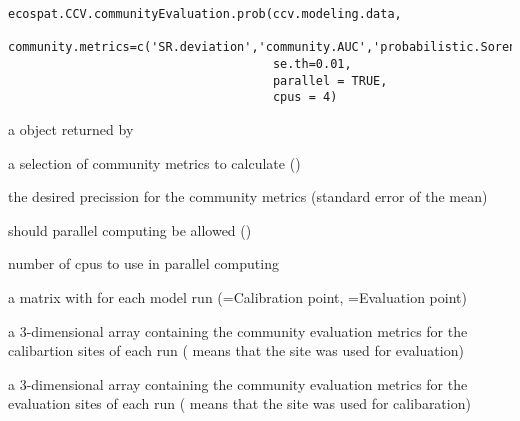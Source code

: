 \documentclass[a4paper]{book}
\begin{document}
%
\begin{Usage}
\begin{verbatim}
ecospat.CCV.communityEvaluation.prob(ccv.modeling.data, 
                                     community.metrics=c('SR.deviation','community.AUC','probabilistic.Sorensen'), 
                                     se.th=0.01, 
                                     parallel = TRUE, 
                                     cpus = 4)
\end{verbatim}
\end{Usage}
%
\begin{Arguments}
\begin{ldescription}
\item[\code{cvv.modeling.data}] a  object returned by 
\item[\code{community.metrics}] a selection of community metrics to calculate ()
\item[\code{se.th}] the desired precission for the community metrics (standard error of the mean)
\item[\code{parallel}] should parallel computing be allowed ()
\item[\code{cpus}] number of cpus to use in parallel computing
\end{ldescription}
\end{Arguments}
%
\begin{Value}
\begin{ldescription}
\item[\code{DataSplitTable}] a matrix with  for each model run (=Calibration point, =Evaluation point)
\item[\code{CommunityEvaluationMetrics.CalibrationSites}] a 3-dimensional array containing the community evaluation metrics for the calibartion sites of each run ( means that the site was used for evaluation)
\item[\code{CommunityEvaluationMetrics.EvaluationSites}] a 3-dimensional array containing the community evaluation metrics for the evaluation sites of each run ( means that the site was used for calibaration)

\end{ldescription}
\end{Value}
%
\end{document}
